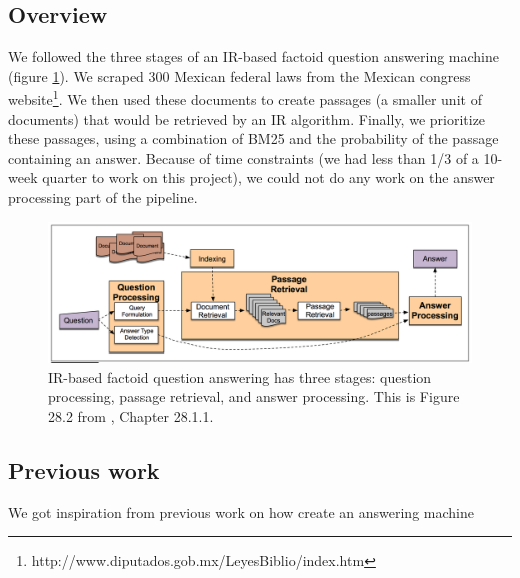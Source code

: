 \documentclass[letterpaper, margin=1in]{article}
\begin{document}
\subsection{Overview}

We followed the three stages of an IR-based factoid question answering machine (figure 	\ref{fig:pipeline}). We scraped 300 Mexican federal laws from the Mexican congress website\footnote{http://www.diputados.gob.mx/LeyesBiblio/index.htm}. We then used these documents to create passages (a smaller unit of documents) that would be retrieved by an IR algorithm. Finally, we prioritize these passages, using a combination of BM25 and the probability of the passage containing an answer. Because of time constraints (we had less than 1/3 of a 10-week quarter to work on this project), we could not do any work on the answer processing part of the pipeline.

\begin{figure}
\centering
\includegraphics[width=1\textwidth]{pipeline.png}
\caption{\label{fig:pipeline}IR-based factoid question answering has three stages: question processing, passage retrieval, and answer processing. This is Figure 28.2 from \cite{jurafsky}, Chapter 28.1.1.}
\end{figure}

\subsection{Previous work}

We got inspiration from previous work on how create an answering machine
\end{document}

